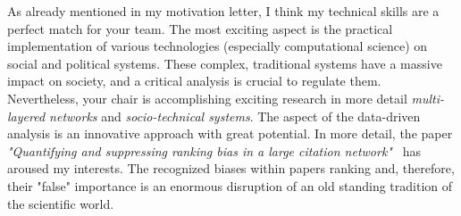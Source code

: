 \begin{homeworkProblem}
  As already mentioned in my motivation letter, I think my technical skills are a perfect match for your team. The most exciting aspect is the practical implementation of various technologies (especially computational science) on social and political systems. These complex, traditional systems have a massive impact on society, and a critical analysis is crucial to regulate them.\\

  Nevertheless, your chair is accomplishing exciting research in more detail \textit{multi-layered networks} and \textit{socio-technical systems}. The aspect of the data-driven analysis is an innovative approach with great potential. In more detail, the paper \textit{"Quantifying and suppressing ranking bias in a large citation network"}~\cite{Vaccario2017Aug} has aroused my interests. The recognized biases within papers ranking and, therefore, their "false" importance is an enormous disruption of an old standing tradition of the scientific world.\\
\end{homeworkProblem}

